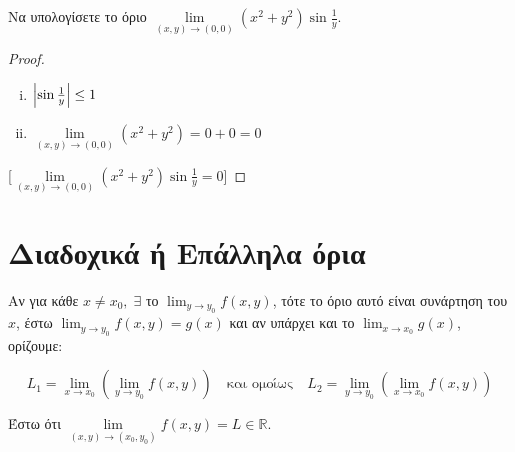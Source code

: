
\begin{example}
    Να υπολογίσετε το όριο $ \lim\limits_{(x,y)\to (0, 0)} (x^{2}+y^{2}) 
    \sin{\frac{1}{y}} $.  

    \begin{proof}
    \item {}
        \begin{minipage}{0.4\textwidth}
            \begin{enumerate}[i)]
                \item $ \abs{\sin{\frac{1}{y}}} \leq 1 $ \hfill {}
                \item $ \lim\limits_{(x,y)\to (0, 0)} (x^{2}+y^{2}) = 0+0=0 $ 
                    \hfill {}
            \end{enumerate}
        \end{minipage}
        [$ \lim\limits_{(x,y)\to (0, 0)} (x^{2}+y^{2}) \sin{\frac{1}{y}} 
        = 0$]
    \end{proof}
\end{example}


\section{Διαδοχικά ή Επάλληλα όρια}

Αν για κάθε $ x \neq x_{0}, \; \exists $ το $ \lim_{y \to y_{0}} f(x,y) $, τότε το όριο 
αυτό είναι συνάρτηση του $x$, έστω $ \lim_{y \to y_{0}} f(x,y) = g(x) $ και 
αν υπάρχει και το $ \lim_{x \to x_{0}} g(x) $, ορίζουμε: 

\[
    L_{1} = \lim_{x \to x_{0}} \left(\lim_{y \to y_{0}} f(x,y)\right) 
    \quad \text{και ομοίως} \quad
    L_{2} = \lim_{y \to y_{0}} \left(\lim_{x \to x_{0}} f(x,y)\right) 
 \] 

Έστω ότι $ \lim\limits_{(x,y)\to (x_{0}, y_{0})} f(x,y) = L \in \mathbb{R} $.

